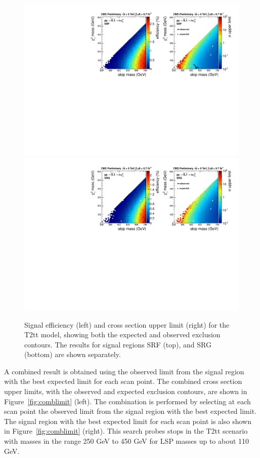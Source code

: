 \begin{figure}[hbt]
  \begin{center}
        \includegraphics[width=1.\linewidth]{plots/T2tt_SRF.pdf}
        \includegraphics[width=1.\linewidth]{plots/T2tt_SRG.pdf}
    \caption{Signal efficiency (left) and cross section upper limit
      (right) for the T2tt model, showing both the expected and
      observed exclusion contours. The results for signal regions SRF (top),
      and SRG (bottom) are shown separately.}
\label{fig:allsrlimits3}
      \end{center}
\end{figure}

A combined result is obtained using the observed limit from the signal
region with the best expected limit for each scan point. The combined cross
section upper limits, with the observed and expected exclusion contours, are
shown in Figure~\ref{fig:comblimit} (left).
The combination is performed by selecting at each scan point the
observed limit from the signal region with the best expected limit.
The signal region with the best expected limit for each scan point is
also shown in Figure~\ref{fig:comblimit} (right). This search probes
stops in the T2tt scenario with masses in the range 250 GeV to 450 GeV for LSP masses up to
about 110 GeV.

